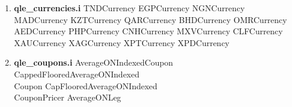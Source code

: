 \documentclass[10pt]{article}
\begin{document}
\begin{multicols}{2}
\begin{enumerate}
        \item \textbf{qle\_currencies.i}
                \subitem TNDCurrency
                \subitem EGPCurrency
                \subitem NGNCurrency
                \subitem MADCurrency
                \subitem KZTCurrency
                \subitem QARCurrency
                \subitem BHDCurrency
                \subitem OMRCurrency
                \subitem AEDCurrency
                \subitem PHPCurrency
                \subitem CNHCurrency
                \subitem MXVCurrency
                \subitem CLFCurrency
                \subitem XAUCurrency
                \subitem XAGCurrency
                \subitem XPTCurrency
                \subitem XPDCurrency
        \item \textbf{qle\_coupons.i}
                \subitem AverageONIndexedCoupon
                \subitem CappedFlooredAverageONIndexed \\ \-\hspace{0.70cm}Coupon
                \subitem CapFlooredAverageONIndexed \\ \-\hspace{0.70cm}CouponPricer
                \subitem AverageONLeg
    \end{enumerate}
\end{multicols}

\pagebreak
\end{document}
